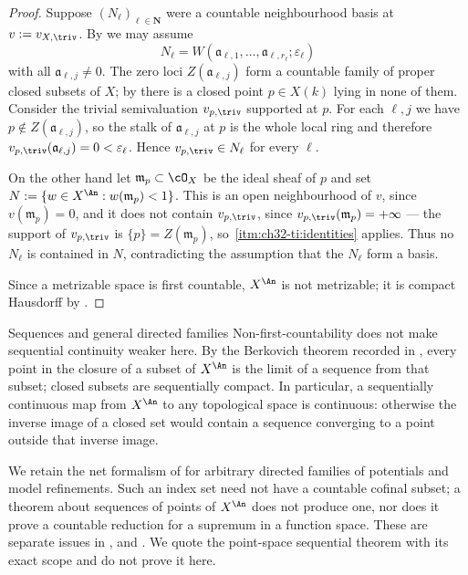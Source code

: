 \begin{proof}
Suppose $(N_\ell)_{\ell\in\mathbf N}$ were a countable neighbourhood basis
at $v:=v_{X,\triv}$.  By  we may
assume
\[
 N_\ell=W(\mathfrak a_{\ell,1},\ldots,\mathfrak a_{\ell,r_\ell};
 \varepsilon_\ell)
\]
with all $\mathfrak a_{\ell,j}\neq0$.  The zero loci
$Z(\mathfrak a_{\ell,j})$ form a countable family of proper closed subsets
of $X$; by  there is a closed point
$p\in X(k)$ lying in none of them.  Consider the trivial semivaluation
$v_{p,\triv}$ supported at $p$.  For each $\ell,j$ we have
$p\notin Z(\mathfrak a_{\ell,j})$, so the stalk of
$\mathfrak a_{\ell,j}$ at $p$ is the whole local ring and therefore
$v_{p,\triv}(\mathfrak a_{\ell,j})=0<\varepsilon_\ell$.  Hence
$v_{p,\triv}\in N_\ell$ for every $\ell$.

On the other hand let $\mathfrak m_p\subset\cO_X$ be the ideal sheaf of
$p$ and set $N:=\{w\in X^{\An}:w(\mathfrak m_p)<1\}$.  This is an open
neighbourhood of $v$, since $v(\mathfrak m_p)=0$, and it does not contain
$v_{p,\triv}$, since $v_{p,\triv}(\mathfrak m_p)=+\infty$ --- the support
of $v_{p,\triv}$ is $\{p\}=Z(\mathfrak m_p)$, so
\,\cref{itm:ch32-ti:identities} applies.
Thus no $N_\ell$ is contained in $N$, contradicting the assumption that
the $N_\ell$ form a basis.

Since a metrizable space is first countable, $X^{\An}$ is not metrizable;
it is compact Hausdorff by .
\end{proof}

\begin{warning}{Sequences and general directed families}
Non-first-countability does not make sequential continuity weaker here.
By the Berkovich theorem recorded in \cite[Remark~1.1]{BJ22}, every point
in the closure of a subset of $X^{\An}$ is the limit of a sequence from
that subset; closed subsets are sequentially compact.  In particular,
a sequentially continuous map from $X^{\An}$ to any topological space is
continuous: otherwise the inverse image of a closed set would contain a
sequence converging to a point outside that inverse image.

We retain the net formalism of  for arbitrary directed
families of potentials and model refinements.  Such an index set need not
have a countable cofinal subset; a theorem about sequences of points of
$X^{\An}$ does not produce one, nor does it prove a countable reduction
for a supremum in a function space.  These are separate issues in
, 
and .  We quote the point-space sequential
theorem with its exact scope and do not prove it here.
\end{warning}

